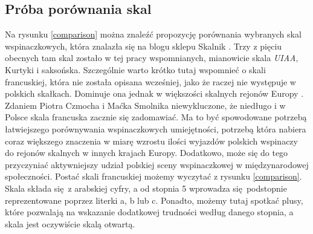 \documentclass{article}
\begin{document}
\subsection{Próba porównania skal}
\label{porownanie}
Na rysunku \ref{comparison} można znaleźć propozycję porównania wybranych skal wspinaczkowych, która znalazła się na blogu sklepu Skalnik \cite{skalnik-skale}. Trzy z pięciu obecnych tam skal zostało w tej pracy wspomnianych, mianowicie skala \textit{UIAA}, Kurtyki i saksońska. Szczególnie warto krótko tutaj wspomnieć o skali francuskiej, która nie została opisana wcześniej, jako że raczej nie występuje w polskich skałkach. Dominuje ona jednak w większości skalnych rejonów Europy \cite{8a-skale}. Zdaniem Piotra Czmocha \cite{8a-skale} i Maćka Smolnika \cite{weld-skale} niewykluczone, że niedługo i w Polsce skala francuska zacznie się zadomawiać. Ma to być spowodowane potrzebą łatwiejszego porównywania wspinaczkowych umiejętności, potrzebą która nabiera coraz większego znaczenia w miarę wzrostu ilości wyjazdów polskich wspinaczy do rejonów skalnych w innych krajach Europy. Dodatkowo, może się do tego przyczyniać aktywniejszy udział polskiej sceny wspinaczkowej w międzynarodowej społeczności. Postać skali francuskiej możemy wyczytać z rysunku \ref{comparison}. Skala składa się z arabskiej cyfry, a od stopnia 5 wprowadza się podstopnie reprezentowane poprzez literki a, b lub c. Ponadto, możemy tutaj spotkać plusy, które pozwalają na wskazanie dodatkowej trudności według danego stopnia, a skala jest oczywiście skalą otwartą.
\end{document}

